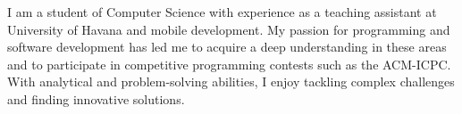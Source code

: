 
    I am a student of Computer Science with experience as a teaching assistant at University of Havana and mobile development. 
    My passion for programming and software development has led me to acquire a deep understanding in these areas and 
    to participate in competitive programming contests such as the ACM-ICPC. With analytical and problem-solving abilities, 
    I enjoy tackling complex challenges and finding innovative solutions.

